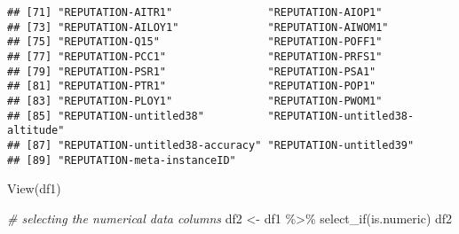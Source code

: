 \documentclass[
]{article}
\newenvironment{Shaded}{\begin{snugshade}}{\end{snugshade}}
\newcommand{\CommentTok}[1]{\textcolor[rgb]{0.56,0.35,0.01}{\textit{#1}}}
\newcommand{\FunctionTok}[1]{\textcolor[rgb]{0.00,0.00,0.00}{#1}}
\newcommand{\NormalTok}[1]{#1}
\newcommand{\OtherTok}[1]{\textcolor[rgb]{0.56,0.35,0.01}{#1}}
\newcommand{\SpecialCharTok}[1]{\textcolor[rgb]{0.00,0.00,0.00}{#1}}
\begin{document}
\begin{verbatim}
## [71] "REPUTATION-AITR1"               "REPUTATION-AIOP1"              
## [73] "REPUTATION-AILOY1"              "REPUTATION-AIWOM1"             
## [75] "REPUTATION-Q15"                 "REPUTATION-POFF1"              
## [77] "REPUTATION-PCC1"                "REPUTATION-PRFS1"              
## [79] "REPUTATION-PSR1"                "REPUTATION-PSA1"               
## [81] "REPUTATION-PTR1"                "REPUTATION-POP1"               
## [83] "REPUTATION-PLOY1"               "REPUTATION-PWOM1"              
## [85] "REPUTATION-untitled38"          "REPUTATION-untitled38-altitude"
## [87] "REPUTATION-untitled38-accuracy" "REPUTATION-untitled39"         
## [89] "REPUTATION-meta-instanceID"
\end{verbatim}

\begin{Shaded}
\begin{Highlighting}[]
\FunctionTok{View}\NormalTok{(df1)}
\end{Highlighting}
\end{Shaded}

\begin{Shaded}
\begin{Highlighting}[]
\CommentTok{\# selecting the numerical data columns}
\NormalTok{df2 }\OtherTok{\textless{}{-}}\NormalTok{ df1 }\SpecialCharTok{\%\textgreater{}\%} \FunctionTok{select\_if}\NormalTok{(is.numeric)}
\NormalTok{df2}
\end{Highlighting}
\end{Shaded}
\end{document}
